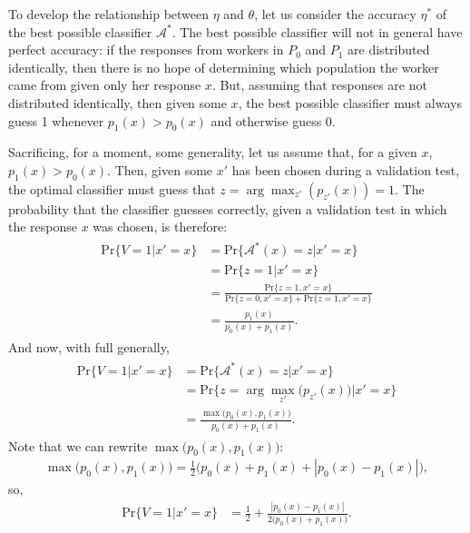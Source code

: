 \documentclass[12pt]{article}
\begin{document}
To develop the relationship between $\eta$ and $\theta$, let us consider
the accuracy $\eta^*$ of the best possible classifier $\mathcal{A}^*$.
The best possible classifier will not in general have perfect accuracy:
if the responses from workers in $P_0$ and $P_1$ are distributed 
identically, then there is no hope of determining which population the worker 
came from given only her response $x$.  But, assuming that responses are
not distributed identically, then given some $x$, the best possible 
classifier must always guess 1 whenever $p_1(x) > p_0(x)$ and otherwise 
guess 0.

Sacrificing, for a moment, some generality, let us assume that, for a given 
$x$, $p_1(x) > p_0(x)$.  
Then, given some $x'$ has been chosen during a 
validation test, the optimal classifier must guess that 
$z = \arg\!\max_{z'}(p_{z'}(x)) = 1$.
The probability that the classifier guesses correctly, given a validation
test in which the response $x$ was chosen, is therefore:
\begin{align}
	\begin{split}
	\mathrm{Pr}\{V = 1 | x' = x \} 
		&= \mathrm{Pr}\{\mathcal{A^*}(x) = z | x' = x \} \\
		&= \mathrm{Pr}\{z = 1 | x' = x \}  \\
		&= \frac{\mathrm{Pr}\{z = 1 , x' = x\}}
			{ \mathrm{Pr}\{z=0 , x'=x\} + \mathrm{Pr}\{z=1 , x'=x\}} \\
		&= \frac{p_1(x)}{p_0(x) + p_1(x)}.
	\end{split}
\end{align}
And now, with full generally,
\begin{align}
	\begin{split}
	\mathrm{Pr}\{V=1 | x' = x \} 
		&= \mathrm{Pr}\{\mathcal{A^*}(x) = z | x' = x \} \\
		&= \mathrm{Pr}\{z = \arg\!\max_{z'}\big(p_{z'}(x)\big)| x' = x \}  \\
		&= \frac{\max\big( p_0(x),p_1(x) \big)}
		{ p_0(x) + p_1(x) }.
	\end{split}
\end{align}
Note that we can rewrite $\max\big(p_0(x),p_1(x)\big)$:
\begin{align}
	\max\big(p_0(x),p_1(x)\big) = \frac{1}{2}
		\big(
			p_0(x) + p_1(x) + |p_0(x) - p_1(x)|
		\big),
\end{align}
so,
\begin{align}
	\mathrm{Pr}\{V = 1 | x' = x \} 
	&= \frac{1}{2} + \frac{|p_0(x) - p_1(x)|}{2 \big(p_0(x) + p_1(x) \big)}.
\end{align}
\end{document}
